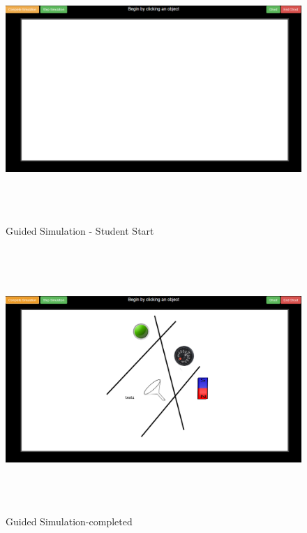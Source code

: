 \documentclass[12pt]{report}
\begin{document}
\begin{figure}[H]
 \centering 
 \includegraphics[width=15cm, height=10cm]{./309.jpg}
 \caption{ Guided Simulation - Student Start\label{fig:309}}
\end{figure}
\begin{figure}[H]
 \centering 
 \includegraphics[width=15cm, height=10cm]{./310.jpg}
 \caption{Guided Simulation-completed \label{fig:310}}
\end{figure}
\end{document}
